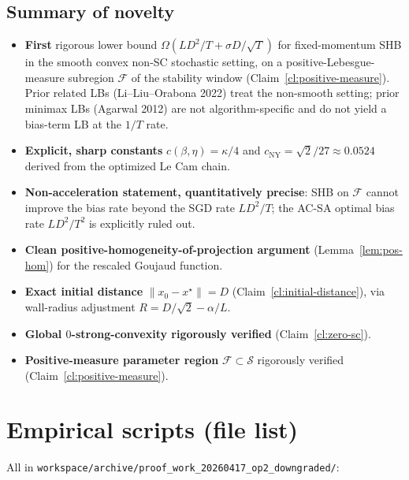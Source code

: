 \documentclass[11pt]{article}
\theoremstyle{definition}
\theoremstyle{remark}
\begin{document}
\subsection{Summary of novelty}

\begin{itemize}
\item \textbf{First} rigorous lower bound $\Omega(LD^2/T + \sigma D/\sqrt T)$ for fixed-momentum SHB in the smooth convex non-SC stochastic setting, on a positive-Lebesgue-measure subregion $\mathcal{F}$ of the stability window (Claim~\ref{cl:positive-measure}). Prior related LBs (Li--Liu--Orabona 2022) treat the non-smooth setting; prior minimax LBs (Agarwal 2012) are not algorithm-specific and do not yield a bias-term LB at the $1/T$ rate.
\item \textbf{Explicit, sharp constants} $c(\beta,\eta) = \kappa/4$ and $c_{\mathrm{NY}} = \sqrt 2/27 \approx 0.0524$ derived from the optimized Le Cam chain.
\item \textbf{Non-acceleration statement, quantitatively precise}: SHB on $\mathcal{F}$ cannot improve the bias rate beyond the SGD rate $LD^2/T$; the AC-SA optimal bias rate $LD^2/T^2$ is explicitly ruled out.
\item \textbf{Clean positive-homogeneity-of-projection argument} (Lemma~\ref{lem:pos-hom}) for the rescaled Goujaud function.
\item \textbf{Exact initial distance} $\|x_0 - x^\star\| = D$ (Claim~\ref{cl:initial-distance}), via wall-radius adjustment $R = D/\sqrt 2 - \alpha/L$.
\item \textbf{Global $0$-strong-convexity rigorously verified} (Claim~\ref{cl:zero-sc}).
\item \textbf{Positive-measure parameter region} $\mathcal{F} \subset \mathcal{S}$ rigorously verified (Claim~\ref{cl:positive-measure}).
\end{itemize}

\appendix

\section{Empirical scripts (file list)}

All in \texttt{workspace/archive/proof\_work\_20260417\_op2\_downgraded/}:
\end{document}
